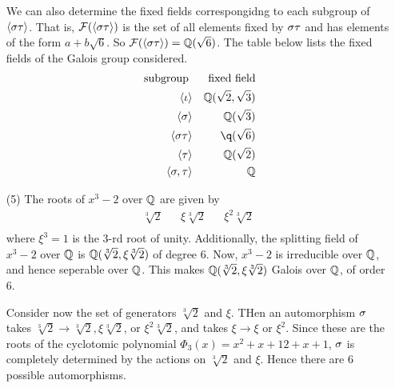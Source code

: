 \begin{example}
\begin{enumerate}
            We can also determine the fixed fields correspongidng to each
            subgroup of  $\langle \sigma \tau \rangle$. That is, $\mathcal{F}(\langle \sigma\tau
            \rangle)$ is the set of all elements fixed by $\sigma\tau$ and has
            elements of the form  $a+b\sqrt{6}$. So $\mathcal{F}(\langle \sigma\tau
            \rangle)=\mathbb{Q}(\sqrt{6})$. The table below lists the fixed fields of
            the Galois group considered.
            \begin{align*}
                \text{ subgroup }   &&  \text{ fixed field} \\
                \langle \i \rangle  &&  \Q(\sqrt{2},\sqrt{3})   \\
                \langle \s \rangle  &&  \Q(\sqrt{3})    \\
                \langle \s\t \rangle    &&  \q(\sqrt{6})    \\
                \langle \t \rangle  &&  \Q(\sqrt{2})    \\
                \langle \s,\t \rangle   &&  \Q  \\
            \end{align*}

        \item[(5)] The roots of $x^3-2$ over  $\mathbb{Q}$ are given by
            \begin{align*}
                \sqrt[3]{2} && \xi\sqrt[3]{2}   &&  \xi^2\sqrt[3]{2}    \\
            \end{align*}
            where $\xi^3=1$ is the  $3$-rd root of unity. Additionally, the
            splitting field of  $x^3-2$ over  $\mathbb{Q}$ is  $\mathbb{Q}(\sqrt[3]{2},
            \xi\sqrt[3]{2})$ of degree $6$. Now,  $x^3-2$ is irreducible over
            $\mathbb{Q}$, and hence seperable over  $\mathbb{Q}$. This makes  $\mathbb{Q}(\sqrt[3]{2},
            \xi\sqrt[3]{2})$ Galois over $\mathbb{Q}$, of order  $6$.

            Consider now the set of generators $\sqrt[3]{2}$ and $\xi$. THen an
            automorphism  $\sigma$ takes  $\sqrt[3]{2} \xrightarrow{} \sqrt[3]{2},
            \xi\sqrt[3]{2}$, or $\xi^2\sqrt[3]{2}$, and takes  $\xi
            \xrightarrow{} \xi$ or $\xi^2$. Since these are the roots of the
            cyclotomic polynomial $\Phi_3(x)=x^2+x+12+x+1$, $\sigma$ is completely
            determined by the actions on  $\sqrt[3]{2}$ and  $\xi$. Hence there
            are  $6$ possible automorphisms.


\end{enumerate}
\end{example}
